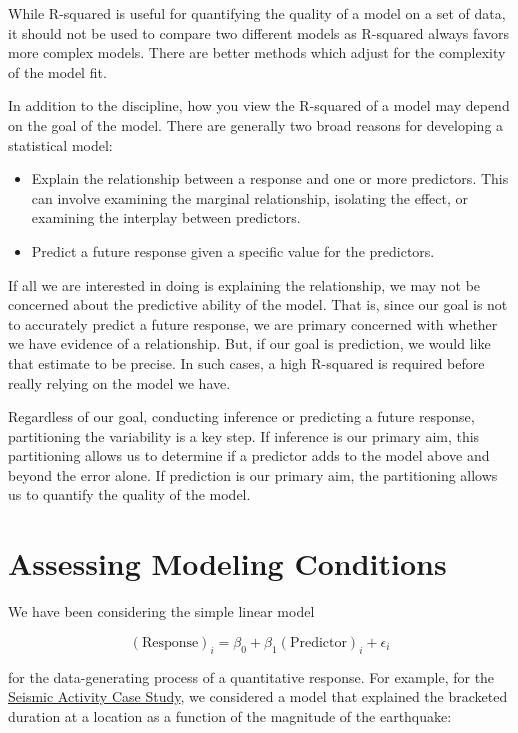 \documentclass[]{book}
\providecommand{\tightlist}{%
  \setlength{\itemsep}{0pt}\setlength{\parskip}{0pt}}
\theoremstyle{plain}
\theoremstyle{mydefn}
\theoremstyle{myexmpl}
\theoremstyle{remark}
\let\BeginKnitrBlock\begin \let\EndKnitrBlock\end
\let\BeginKnitrBlock\begin \let\EndKnitrBlock\end
\begin{document}
\BeginKnitrBlock{rmdtip}
While R-squared is useful for quantifying the quality of a model on a
set of data, it should not be used to compare two different models as
R-squared always favors more complex models. There are better methods
which adjust for the complexity of the model fit.
\EndKnitrBlock{rmdtip}

In addition to the discipline, how you view the R-squared of a model may
depend on the goal of the model. There are generally two broad reasons
for developing a statistical model:

\begin{itemize}
\tightlist
\item
  Explain the relationship between a response and one or more
  predictors. This can involve examining the marginal relationship,
  isolating the effect, or examining the interplay between predictors.
\item
  Predict a future response given a specific value for the predictors.
\end{itemize}

If all we are interested in doing is explaining the relationship, we may
not be concerned about the predictive ability of the model. That is,
since our goal is not to accurately predict a future response, we are
primary concerned with whether we have evidence of a relationship. But,
if our goal is prediction, we would like that estimate to be precise. In
such cases, a high R-squared is required before really relying on the
model we have.

Regardless of our goal, conducting inference or predicting a future
response, partitioning the variability is a key step. If inference is
our primary aim, this partitioning allows us to determine if a predictor
adds to the model above and beyond the error alone. If prediction is our
primary aim, the partitioning allows us to quantify the quality of the
model.

\chapter{Assessing Modeling Conditions}\label{Regassessment}

We have been considering the simple linear model

\[(\text{Response})_i = \beta_0 + \beta_1 (\text{Predictor})_{i} + \epsilon_i\]

for the data-generating process of a quantitative response. For example,
for the \protect\hyperlink{CaseGreece}{Seismic Activity Case Study}, we
considered a model that explained the bracketed duration at a location
as a function of the magnitude of the earthquake:
\end{document}
